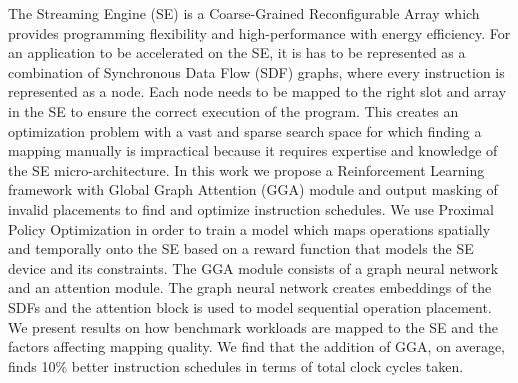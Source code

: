 The Streaming Engine (SE) is a Coarse-Grained Reconfigurable Array which provides programming flexibility and high-performance with energy efficiency.
For an application to be accelerated on the SE, it is has to be represented as a combination of Synchronous Data Flow (SDF) graphs, where every instruction is represented as a node.
Each node needs to be mapped to the right slot and array in the SE to ensure the correct execution of the program.
This creates an optimization problem with a vast and sparse search space for which finding a mapping manually is impractical because it requires expertise and knowledge of the SE micro-architecture.
In this work we propose a Reinforcement Learning framework with Global Graph Attention (GGA) module and output masking of invalid placements to find and optimize instruction schedules.
We use Proximal Policy Optimization in order to train a model which maps operations spatially and temporally onto the SE based on a reward function that models the SE device and its constraints.
The GGA module consists of a graph neural network and an attention module. 
The graph neural network creates embeddings of the SDFs and the attention block is used to model sequential operation placement. 
We present results on how benchmark workloads are mapped to the SE and the factors affecting mapping quality.
We find that the addition of GGA, on average, finds 10\% better instruction schedules in terms of total clock cycles taken.
